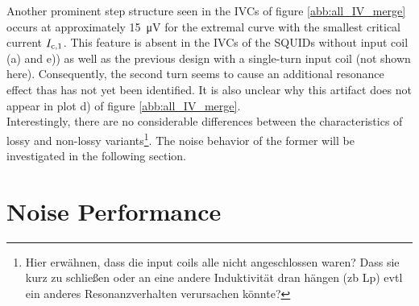 Another prominent step structure seen in the IVCs of figure \ref{abb:all_IV_merge} occurs at approximately \qty{15}{\uV} for the extremal curve with the smallest critical current $I_{\rm c,1}$. This feature is absent in the IVCs of the SQUIDs without input coil (a) and e)) as well as the previous design with a single-turn input coil (not shown here). Consequently, the second turn seems to cause an additional resonance effect thas has not yet been identified. It is also unclear why this artifact does not appear in plot d) of figure \ref{abb:all_IV_merge}. 
\\
Interestingly, there are no considerable differences between the characteristics of lossy and non-lossy variants\footnote{Hier erwähnen, dass die input coils alle nicht angeschlossen waren? Dass sie kurz zu schließen oder an eine andere Induktivität dran hängen (zb Lp) evtl ein anderes Resonanzverhalten verursachen könnte?}. The noise behavior of the former will be investigated in the following section.
 




\section{Noise Performance} \label{sec_noise_results}


